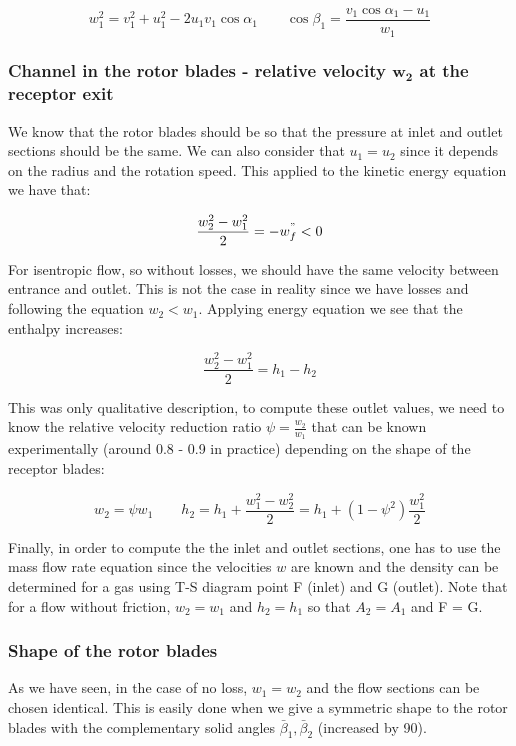 \begin{equation}
w_1 ^2 = v_1^2+u_1^2 - 2u_1v_1\cos \alpha _1\qquad \cos \beta _1 = \frac{v_1\cos \alpha _1 - u_1}{w_1}
\end{equation}

\subsubsection{Channel in the rotor blades - relative velocity $\bm{w_2}$ at the receptor exit}

We know that the rotor blades should be so that the pressure at inlet and outlet sections should be the same. We can also consider that $u_1 = u_2$ since it depends on the radius and the rotation speed. This applied to the kinetic energy equation we have that: 

\begin{equation}
\frac{w_2^2 - w_1^2}{2} = -w^"_f < 0
\end{equation}

For isentropic flow, so without losses, we should have the same velocity between entrance and outlet. This is not the case in reality since we have losses and following the equation $w_2 < w_1$. Applying energy equation we see that the enthalpy increases: 

\begin{equation}
\frac{w_2^2 - w_1^2}{2} = h_1 - h_2
\end{equation}

This was only qualitative description, to compute these outlet values, we need to know the relative velocity reduction ratio $\psi = \frac{w_2}{w_1}$ that can be known experimentally (around 0.8 - 0.9 in practice) depending on the shape of the receptor blades:

\begin{equation}
w_2 = \psi w_1 \qquad h_2 = h_1 + \frac{w_1^2 - w_2 ^2}{2} = h_1 + (1- \psi ^2) \frac{w^2_1}{2}
\end{equation}

Finally, in order to compute the the inlet and outlet sections, one has to use the mass flow rate equation since the velocities $w$ are known and the density can be determined for a gas using T-S diagram point F (inlet) and G (outlet). Note that for a flow without friction, $w_2  = w_1$ and $h_2 = h_1$ so that $A_2 = A_1$ and F = G. 

\subsubsection{Shape of the rotor blades}
As we have seen, in the case of no loss, $w_1 = w_2$ and the flow sections can be chosen identical. This is easily done when we give a symmetric shape to the rotor blades with the complementary solid angles $\bar{\beta}_1, \bar{\beta}_2$ (increased by 90\degres). \\

